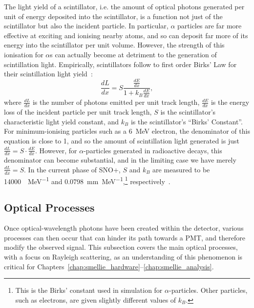 The light yield of a scintillator, i.e. the amount of optical photons generated per unit of energy deposited into the scintillator, is a function not just of the scintillator but also the incident particle. In particular, $\alpha$ particles are far more effective at exciting and ionising nearby atoms, and so can deposit far more of its energy into the scintillator per unit volume. However, the strength of this ionisation for $\alpha$s can actually become at detriment to the generation of scintillation light. Empirically, scintillators follow to first order Birks' Law for their scintillation light yield~\cite{}: %
\begin{equation}
    \frac{dL}{dx} = S\frac{\frac{dE}{dx}}{1+k_{B}\frac{dE}{dx}},
\end{equation}
where $\frac{dL}{dx}$ is the number of photons emitted per unit track length, $\frac{dE}{dx}$ is the energy loss of the incident particle per unit track length, $S$ is the scintillator's characteristic light yield constant, and $k_{B}$ is the scintillator's ``Birks' Constant''. For minimum-ionising particles such as a \SI{6}{\MeV} electron, the denominator of this equation is close to 1, and so the amount of scintillation light generated is just $\frac{dL}{dx} = S\cdot\frac{dE}{dx}$. However, for $\alpha$-particles generated in radioactive decays, this denominator can become substantial, and in the limiting case we have merely $\frac{dL}{dx} = S$. In the current phase of SNO+, $S$ and $k_{B}$ are measured to be \SI{14000}{\gamma\per\MeV} and \SI{0.0798}{\mm\per\MeV},\footnote{This is the Birks' constant used in simulation for $\alpha$-particles. Other particles, such as electrons, are given slightly different values of $k_{B}$.}
 respectively~\cite{}. %

 \subsection{Optical Processes}
 Once optical-wavelength photons have been created within the detector, various processes can then occur that can hinder its path towards a PMT, and therefore modify the observed signal. This subsection covers the main optical processes, with a focus on Rayleigh scattering, as an understanding of this phenomenon is critical for Chapters~\ref{chap:smellie_hardware}--\ref{chap:smellie_analysis}.
